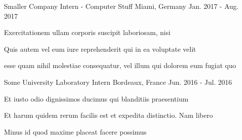 \begin{cventries}

\cventry
{Smaller Company} %
{Intern - Computer Stuff} %
{Miami, Germany} %
{Jan. 2017 - Aug. 2017} %
{ %
\begin{cvitems}
\item {Exercitationem ullam corporis suscipit laboriosam, nisi}
\item {Quis autem vel eum iure reprehenderit qui in ea voluptate velit}
\item {esse quam nihil molestiae consequatur, vel illum qui dolorem eum fugiat quo}
\end{cvitems}
}


\cventry
{Some University} %
{Laboratory Intern} %
{Bordeaux, France} %
{Jun. 2016 - Jul. 2016} %
{ %
\begin{cvitems}
\item {Et iusto odio dignissimos ducimus qui blanditiis praesentium}
\item {Et harum quidem rerum facilis est et expedita distinctio. Nam libero}
\item {Minus id quod maxime placeat facere possimus}
\end{cvitems}
}


\end{cventries}

